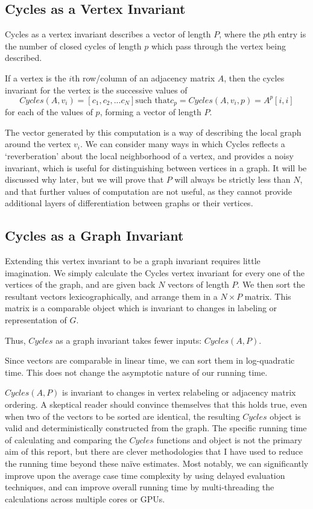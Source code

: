 \subsection{Cycles as a Vertex Invariant}

Cycles as a vertex invariant describes a vector of length $P$, where the $p$th entry is the number of closed cycles of length $p$ which pass through the vertex being described.

If a vertex is the $i$th row/column of an adjacency matrix $A$, then the cycles invariant for the vertex is the successive values of 
$$Cycles(A, v_i) = [c_1, c_2, ... c_N] \text{such that} c_p = Cycles(A, v_i, p) = A^p[i,i]$$
for each of the values of $p$, forming a vector of length $P$.

The vector generated by this computation is a way of describing the local graph around the vertex $v_i$.
We can consider many ways in which Cycles reflects a `reverberation' about the local neighborhood of a vertex, and provides a noisy invariant, which is useful for distinguishing between vertices in a graph. 
It will be discussed why later, but we will prove that $P$ will always be strictly less than $N$, and that further values of computation are not useful, as they cannot provide additional layers of differentiation between graphs or their vertices.


\subsection{Cycles as a Graph Invariant}

Extending this vertex invariant to be a graph invariant requires little imagination. 
We simply calculate the Cycles vertex invariant for every one of the vertices of the graph, and are given back $N$ vectors of length $P$.
We then sort the resultant vectors lexicographically, and arrange them in a $N \times P$ matrix.
This matrix is a comparable object which is invariant to changes in labeling or representation of $G$.

Thus, $Cycles$ as a graph invariant takes fewer inputs: $Cycles(A, P)$.

Since vectors are comparable in linear time, we can sort them in log-quadratic time.
This does not change the asymptotic nature of our running time.

$Cycles(A, P)$ is invariant to changes in vertex relabeling or adjacency matrix ordering.
A skeptical reader should convince themselves that this holds true, even when two of the vectors to be sorted are identical, the resulting $Cycles$ object is valid and deterministically constructed from the graph.
The specific running time of calculating and comparing the $Cycles$ functions and object is not the primary aim of this report, but there are clever methodologies that I have used to reduce the running time beyond these na\"{i}ve estimates.
Most notably, we can significantly improve upon the average case time complexity by using delayed evaluation techniques, and can improve overall running time by multi-threading the calculations across multiple cores or GPUs.

